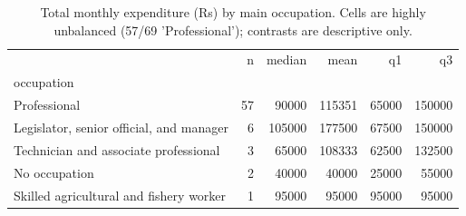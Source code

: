 \begin{table}
\caption{Total monthly expenditure (Rs) by main occupation. Cells are highly unbalanced (57/69 'Professional'); contrasts are descriptive only.}
\label{tab:exp_by_occupation}
\begin{tabular}{lrrrrr}
\toprule
 & n & median & mean & q1 & q3 \\
occupation &  &  &  &  &  \\
\midrule
Professional & 57 & 90000 & 115351 & 65000 & 150000 \\
Legislator, senior official, and manager & 6 & 105000 & 177500 & 67500 & 150000 \\
Technician and associate professional & 3 & 65000 & 108333 & 62500 & 132500 \\
No occupation & 2 & 40000 & 40000 & 25000 & 55000 \\
Skilled agricultural and fishery worker & 1 & 95000 & 95000 & 95000 & 95000 \\
\bottomrule
\end{tabular}
\end{table}
